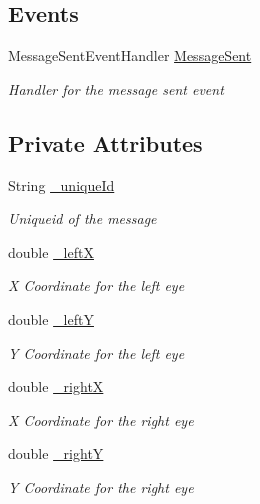 \subsection*{Events}
\begin{DoxyCompactItemize}
\item 
Message\+Sent\+Event\+Handler \hyperlink{class_web_analyzer_1_1_models_1_1_message_model_1_1_data_message_a09dc25c903bc851fddabb0d075cca5f6}{Message\+Sent}
\begin{DoxyCompactList}\small\item\em Handler for the message sent event \end{DoxyCompactList}\end{DoxyCompactItemize}
\subsection*{Private Attributes}
\begin{DoxyCompactItemize}
\item 
String \hyperlink{class_web_analyzer_1_1_models_1_1_message_model_1_1_data_message_a4c8a2ce0d65c6caae14863897eeb602d}{\+\_\+unique\+Id}
\begin{DoxyCompactList}\small\item\em Uniqueid of the message \end{DoxyCompactList}\item 
double \hyperlink{class_web_analyzer_1_1_models_1_1_message_model_1_1_data_message_ac9721293fa81833e18b244b11c6eed11}{\+\_\+left\+X}
\begin{DoxyCompactList}\small\item\em X Coordinate for the left eye \end{DoxyCompactList}\item 
double \hyperlink{class_web_analyzer_1_1_models_1_1_message_model_1_1_data_message_a093686b36f2a672787a3d2a7b03709c8}{\+\_\+left\+Y}
\begin{DoxyCompactList}\small\item\em Y Coordinate for the left eye \end{DoxyCompactList}\item 
double \hyperlink{class_web_analyzer_1_1_models_1_1_message_model_1_1_data_message_a2fea12857a3954edd96d248fa4dbb673}{\+\_\+right\+X}
\begin{DoxyCompactList}\small\item\em X Coordinate for the right eye \end{DoxyCompactList}\item 
double \hyperlink{class_web_analyzer_1_1_models_1_1_message_model_1_1_data_message_a898ed683213c5e3ad74d42b9ecd4e590}{\+\_\+right\+Y}
\begin{DoxyCompactList}\small\item\em Y Coordinate for the right eye \end{DoxyCompactList}\end{DoxyCompactItemize}
